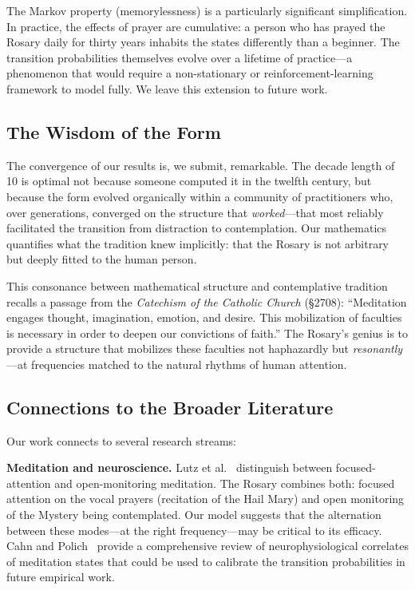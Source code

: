 \documentclass[journal]{IEEEtran}
\theoremstyle{definition}
\theoremstyle{remark}
\begin{document}
The Markov property (memorylessness) is a particularly significant simplification. In practice, the effects of prayer are cumulative: a person who has prayed the Rosary daily for thirty years inhabits the states differently than a beginner. The transition probabilities themselves evolve over a lifetime of practice---a phenomenon that would require a non-stationary or reinforcement-learning framework to model fully. We leave this extension to future work.

\subsection{The Wisdom of the Form}

The convergence of our results is, we submit, remarkable. The decade length of 10 is optimal not because someone computed it in the twelfth century, but because the form evolved organically within a community of practitioners who, over generations, converged on the structure that \emph{worked}---that most reliably facilitated the transition from distraction to contemplation. Our mathematics quantifies what the tradition knew implicitly: that the Rosary is not arbitrary but deeply fitted to the human person.

This consonance between mathematical structure and contemplative tradition recalls a passage from the \emph{Catechism of the Catholic Church} (§2708): ``Meditation engages thought, imagination, emotion, and desire. This mobilization of faculties is necessary in order to deepen our convictions of faith.'' The Rosary's genius is to provide a structure that mobilizes these faculties not haphazardly but \emph{resonantly}---at frequencies matched to the natural rhythms of human attention.

\subsection{Connections to the Broader Literature}

Our work connects to several research streams:

\textbf{Meditation and neuroscience.} Lutz et al.~\cite{lutz2008} distinguish between focused-attention and open-monitoring meditation. The Rosary combines both: focused attention on the vocal prayers (recitation of the Hail Mary) and open monitoring of the Mystery being contemplated. Our model suggests that the alternation between these modes---at the right frequency---may be critical to its efficacy. Cahn and Polich~\cite{cahn2006} provide a comprehensive review of neurophysiological correlates of meditation states that could be used to calibrate the transition probabilities in future empirical work.
\end{document}

